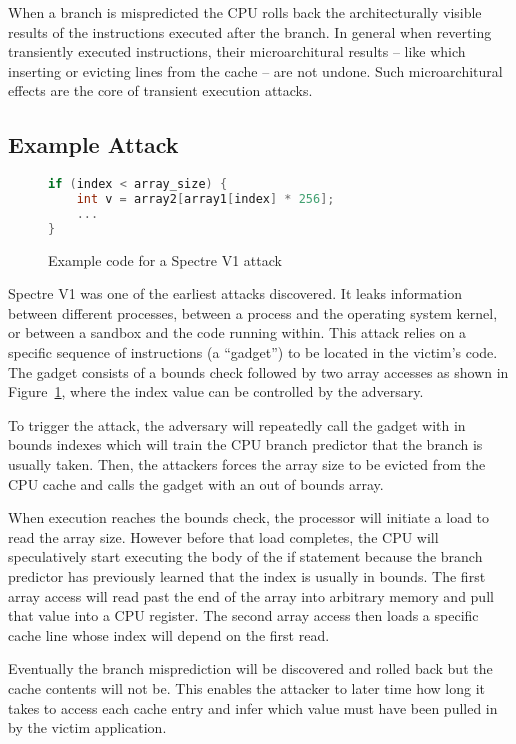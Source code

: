 When a branch is mispredicted the CPU rolls back the architecturally visible results of the instructions executed after the branch.
In general when reverting transiently executed instructions, their microarchitural results -- like which inserting or evicting lines from the cache -- are not undone.
Such microarchitural effects are the core of transient execution attacks.

\subsection{Example Attack}
\begin{figure}[h]
\begin{lstlisting}[language=C, style=codeStyle]
if (index < array_size) {
    int v = array2[array1[index] * 256];
    ...
}
\end{lstlisting}
\caption{Example code for a Spectre V1 attack}
\label{fig:spectre-code}
\end{figure}
Spectre V1 was one of the earliest attacks discovered.
It leaks information between different processes, between a process and the operating system kernel, or between a sandbox and the code running within.
This attack relies on a specific sequence of instructions (a ``gadget'') to be located in the victim's code.
The gadget consists of a bounds check followed by two array accesses as shown in Figure~\ref{fig:spectre-code}, where the index value can be controlled by the adversary.

To trigger the attack, the adversary will repeatedly call the gadget with in bounds indexes which will train the CPU branch predictor that the branch is usually taken.
Then, the attackers forces the array size to be evicted from the CPU cache and calls the gadget with an out of bounds array.

When execution reaches the bounds check, the processor will initiate a load to read the array size.
However before that load completes, the CPU will speculatively start executing the body of the if statement because the branch predictor has previously learned that the index is usually in bounds.
The first array access will read past the end of the array into arbitrary memory and pull that value into a CPU register.
The second array access then loads a specific cache line whose index will depend on the first read.

Eventually the branch misprediction will be discovered and rolled back but the cache contents will not be.
This enables the attacker to later time how long it takes to access each cache entry and infer which value must have been pulled in by the victim application.

